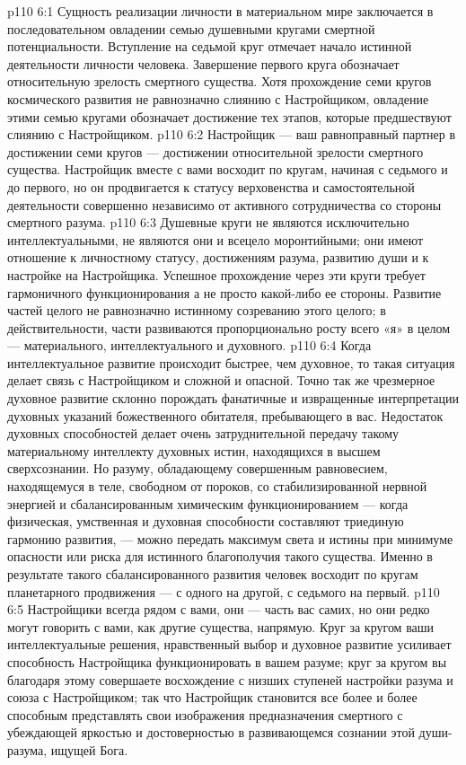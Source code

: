 \vs p110 6:1 Сущность реализации личности в материальном мире заключается в последовательном овладении семью душевными кругами смертной потенциальности. Вступление на седьмой круг отмечает начало истинной деятельности личности человека. Завершение первого круга обозначает относительную зрелость смертного существа. Хотя прохождение семи кругов космического развития не равнозначно слиянию с Настройщиком, овладение этими семью кругами обозначает достижение тех этапов, которые предшествуют слиянию с Настройщиком.
\vs p110 6:2 Настройщик --- ваш равноправный партнер в достижении семи кругов --- достижении относительной зрелости смертного существа. Настройщик вместе с вами восходит по кругам, начиная с седьмого и до первого, но он продвигается к статусу верховенства и самостоятельной деятельности совершенно независимо от активного сотрудничества со стороны смертного разума.
\vs p110 6:3 \pc Душевные круги не являются исключительно интеллектуальными, не являются они и всецело моронтийными; они имеют отношение к личностному статусу, достижениям разума, развитию души и к настройке на Настройщика. Успешное прохождение через эти круги требует гармоничного функционирования  а не просто какой\hyp{}либо ее стороны. Развитие частей целого не равнозначно истинному созреванию этого целого; в действительности, части развиваются пропорционально росту всего «я» в целом --- материального, интеллектуального и духовного.
\vs p110 6:4 Когда интеллектуальное развитие происходит быстрее, чем духовное, то такая ситуация делает связь с Настройщиком и сложной и опасной. Точно так же чрезмерное духовное развитие склонно порождать фанатичные и извращенные интерпретации духовных указаний божественного обитателя, пребывающего в вас. Недостаток духовных способностей делает очень затруднительной передачу такому материальному интеллекту духовных истин, находящихся в высшем сверхсознании. Но разуму, обладающему совершенным равновесием, находящемуся в теле, свободном от пороков, со стабилизированной нервной энергией и сбалансированным химическим функционированием --- когда физическая, умственная и духовная способности составляют триединую гармонию развития, --- можно передать максимум света и истины при минимуме опасности или риска для истинного благополучия такого существа. Именно в результате такого сбалансированного развития человек восходит по кругам планетарного продвижения --- с одного на другой, с седьмого на первый.
\vs p110 6:5 \pc Настройщики всегда рядом с вами, они --- часть вас самих, но они редко могут говорить с вами, как другие существа, напрямую. Круг за кругом ваши интеллектуальные решения, нравственный выбор и духовное развитие усиливает способность Настройщика функционировать в вашем разуме; круг за кругом вы благодаря этому совершаете восхождение с низших ступеней настройки разума и союза с Настройщиком; так что Настройщик становится все более и более способным представлять свои изображения предназначения смертного с убеждающей яркостью и достоверностью в развивающемся сознании этой души\hyp{}разума, ищущей Бога.
